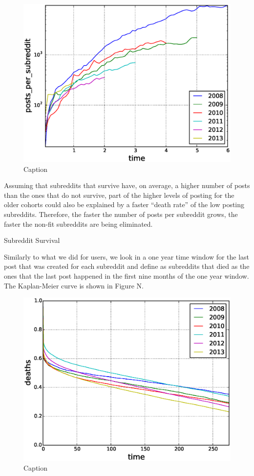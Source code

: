 \begin{figure}[!tb]
\centering
\includegraphics[scale=0.4]{./images/posts_per_subreddit_cohorts.eps}
\caption{Caption}
\label{fig:posts_per_subreddit_cohorts}
\end{figure}

Assuming that subreddits that survive have, on average, a higher number of posts than the ones that do not survive, part of the higher levels of posting for the older cohorts could also be explained by a faster ``death rate'' of the low posting subreddits. Therefore, the faster the number of posts per subreddit grows, the faster the non-fit subreddits are being eliminated.

Subreddit Survival

Similarly to what we did for users, we look in a one year time window for the last post that was created for each subreddit and define as subreddits that died as the ones that the last post happened in the first nine months of the one year window. The Kaplan-Meier curve is shown in Figure N.

\begin{figure}[!tb]
\centering
\includegraphics[scale=0.4]{./images/kaplan_meier_subreddits.eps}
\caption{Caption}
\label{fig:kaplan_meier_subreddits}
\end{figure}

